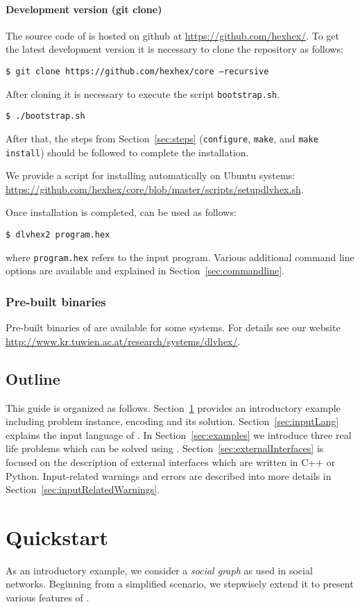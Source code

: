 \documentclass[a4paper, titlepage]{article}
\newcommand\leftaligned[1]{\par \smallskip \noindent \qquad #1 \smallskip \par}
\begin{document}
\paragraph{Development version (git clone)}
The source code of \dlvhex{} is hosted on github at 
\url{https://github.com/hexhex/}. To get the latest 
development version it is necessary to clone the repository as 
follows:
%
\leftaligned{\texttt{\$ \thinspace
%
git clone 
https://github.com/hexhex/core --recursive}} 
After cloning it is necessary to 
execute the script \texttt{bootstrap.sh}.
%
\leftaligned{\texttt{\$ \thinspace ./bootstrap.sh}} 
%
After that, the steps from 
Section~\ref{sec:steps} (\texttt{configure}, \texttt{make}, and 
\texttt{make install}) should be followed to 
complete the installation.

We provide a script for installing \dlvhex{} 
automatically on Ubuntu systems:
\url{https://github.com/hexhex/core/blob/master/scripts/setupdlvhex.sh}.

Once installation is completed, \dlvhex{} can be used as follows:
%
\leftaligned{\texttt{\$ \thinspace dlvhex2 program.hex}} 
%
where \texttt{program.hex} refers to the input program.
Various additional command line options are available
and explained in Section~\ref{sec:commandline}.    

\subsubsection{Pre-built binaries}
Pre-built binaries of \dlvhex{} are available for some 
systems. For details see our website 
\url{http://www.kr.tuwien.ac.at/research/systems/dlvhex/}. 

\subsection{Outline}
This guide is organized as follows. Section~\ref{sec:quick} 
provides an introductory example including
problem instance, encoding and its solution.
Section~\ref{sec:inputLang} explains the input language of \dlvhex{}.
In Section~\ref{sec:examples} we 
introduce three real life problems which can be solved 
using \hex{}. Section~\ref{sec:externalInterfaces} is 
focused on the description of external interfaces which are 
written in C++ or Python. Input-related warnings and errors 
are described into more details in 
Section~\ref{sec:inputRelatedWarnings}.

\section{Quickstart} %
\label{sec:quick}
As an introductory example, we consider a \emph{social 
graph} as used in social networks. Beginning from a 
simplified scenario, we stepwisely extend it to present 
various features of \dlvhex{}.
\end{document}

